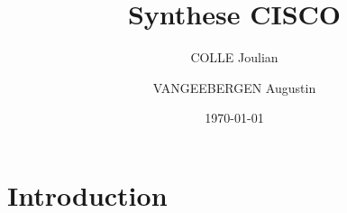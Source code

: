 \documentclass{article}
\title{Synthese CISCO}
\author{COLLE Joulian \and VANGEEBERGEN Augustin}
\date{\today}
\begin{document}
\maketitle
\newpage

\tableofcontents
\newpage
	
\section{Introduction}
\end{document}
